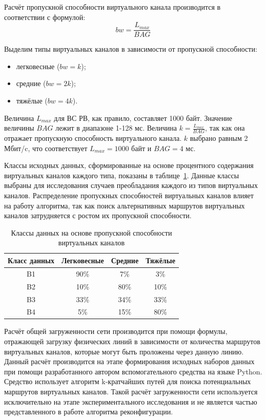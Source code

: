 \documentclass[12pt, a4paper]{article}
\begin{document}
Расчёт пропускной способности виртуального канала производится в соответствии с формулой:
$$bw = \frac{L_{max}}{BAG}$$

Выделим типы виртуальных каналов в зависимости от пропускной способности:
\begin{itemize}
	\item легковесные ($bw=k$);
	\item средние ($bw=2k$);
	\item тяжёлые ($bw=4k$).
\end{itemize}

Величина $L_{max}$ для ВС РВ, как правило, составляет 1000 байт. Значение величины ${BAG}$ лежит в диапазоне 1-128 мс. Величина $k = \frac{L_{max}}{BAG}$, так как она отражает пропускную способность виртуального канала. $k$ выбрано равным 2 Мбит/c, что соответствует  $L_{max} = 1000$ байт и  $BAG = 4$ мс.

Классы исходных данных, сформированные на основе процентного содержания виртуальных каналов каждого типа, показаны в таблице~\ref{table:bwclass}. Данные классы выбраны для исследования случаев преобладания каждого из типов виртуальных каналов. Распределение пропускных способностей виртуальных каналов влияет на работу алгоритма, так как поиск альтернативных маршрутов виртуальных каналов затрудняется с ростом их пропускной способности.

\begin{table}[h]
	\caption{Классы данных на основе пропускной способности виртуальных каналов}
	\label{table:bwclass}
\begin{center}
\begin{tabular}{|c|c|c|c|}
\hline
	 Класс данных& Легковесные & Средние & Тяжёлые\\
\hline
	B1 & 90\% & 7\% & 3\% \\
\hline
 B2 & 10\% & 80\% & 10\% \\
\hline
	B3 & 33\% & 34\% & 33\% \\
\hline
	B4 & 5\% & 15\% & 80\% \\
\hline
\end{tabular}
\end{center}
\end{table}

Расчёт общей загруженности сети производится при помощи формулы, отражающей загрузку физических линий в зависимости от количества маршрутов виртуальных каналов, которые могут быть проложены через данную линию. Данный расчёт производится на этапе формирования исходных наборов данных при помощи разработанного автором вспомогательного средства на языке Python. Средство использует алгоритм k-кратчайших путей для поиска потенциальных маршрутов виртуальных каналов. Такой расчёт загруженности сети используется исключительно на этапе экспериментального исследования и не является частью представленного в работе алгоритма реконфигурации.
\end{document}
